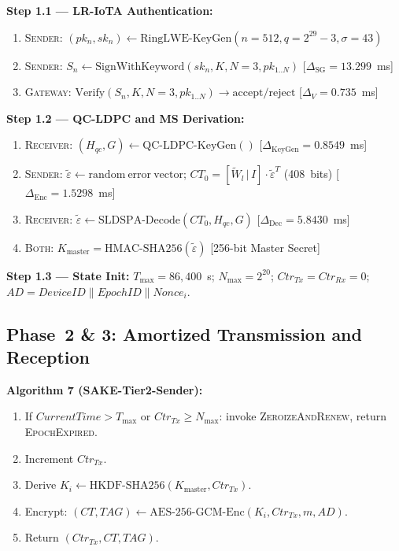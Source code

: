 \documentclass[runningheads]{llncs}
\newcommand{\Kmaster}{K_{\mathrm{master}}}
\newcommand{\Nmax}{N_{\max}}
\newcommand{\Tmax}{T_{\max}}
\begin{document}
\textbf{Step 1.1 --- LR-IoTA Authentication:}
\begin{enumerate}
  \item \textsc{Sender}: $(pk_n, sk_n) \leftarrow \mathrm{RingLWE\text{-}KeyGen}(n{=}512, q{=}2^{29}{-}3, \sigma{=}43)$
  \item \textsc{Sender}: $S_n \leftarrow \mathrm{SignWithKeyword}(sk_n, K, N{=}3, pk_{1..N})$ [$\Delta_{\mathrm{SG}} = 13.299$~ms]
  \item \textsc{Gateway}: $\mathrm{Verify}(S_n, K, N{=}3, pk_{1..N}) \to \mathrm{accept/reject}$ [$\Delta_V = 0.735$~ms]
\end{enumerate}

\textbf{Step 1.2 --- QC-LDPC and MS Derivation:}
\begin{enumerate}
  \item \textsc{Receiver}: $(H_{qc}, G) \leftarrow \mathrm{QC\text{-}LDPC\text{-}KeyGen}()$ [$\Delta_{\mathrm{KeyGen}} = 0.8549$~ms]
  \item \textsc{Sender}: $\tilde{\varepsilon} \leftarrow \mathrm{random\ error\ vector}$; $CT_0 = [\tilde{W}_l\,|\,I] \cdot \tilde{\varepsilon}^T$ (408~bits) [$\Delta_{\mathrm{Enc}} = 1.5298$~ms]
  \item \textsc{Receiver}: $\tilde{\varepsilon} \leftarrow \mathrm{SLDSPA\text{-}Decode}(CT_0, H_{qc}, G)$ [$\Delta_{\mathrm{Dec}} = 5.8430$~ms]
  \item \textsc{Both}: $\Kmaster = \mathrm{HMAC\text{-}SHA256}(\tilde{\varepsilon})$ [256-bit Master Secret]
\end{enumerate}

\textbf{Step 1.3 --- State Init:}
$\Tmax = 86{,}400$~s; $\Nmax = 2^{20}$; $\mathit{Ctr}_{Tx} = \mathit{Ctr}_{Rx} = 0$;
$AD = \mathit{DeviceID} \| \mathit{EpochID} \| \mathit{Nonce}_i$.

\subsection{Phase~2 \& 3: Amortized Transmission and Reception}

\noindent\textbf{Algorithm 7 (SAKE-Tier2-Sender):}
\begin{enumerate}
  \item If $\mathit{CurrentTime} > \Tmax$ or $\mathit{Ctr}_{Tx} \geq \Nmax$: invoke \textsc{ZeroizeAndRenew}, return \textsc{EpochExpired}.
  \item Increment $\mathit{Ctr}_{Tx}$.
  \item Derive $K_i \leftarrow \mathrm{HKDF\text{-}SHA256}(\Kmaster, \mathit{Ctr}_{Tx})$.
  \item Encrypt: $(CT, TAG) \leftarrow \mathrm{AES\text{-}256\text{-}GCM\text{-}Enc}(K_i, \mathit{Ctr}_{Tx}, m, AD)$.
  \item Return $(\mathit{Ctr}_{Tx}, CT, TAG)$.
\end{enumerate}
\end{document}
